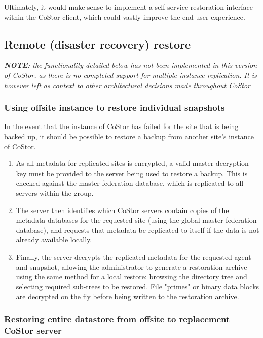 \documentclass[bsc,frontabs,twoside,singlespacing,parskip,deptreport]{infthesis}     %
\begin{document}
Ultimately, it would make sense to implement a self-service restoration interface within the CoStor
client, which could vastly improve the end-user experience.

\subsection{Remote (disaster recovery) restore}

\textit{\textbf{NOTE:} the functionality detailed below has not been implemented in this version of CoStor, as there is no completed support for multiple-instance replication. It is however left as context to other architectural decisions made throughout CoStor}

\subsubsection{Using offsite instance to restore individual snapshots}

In the event that the instance of CoStor has failed for the site that is being backed up, it should
be possible to restore a backup from another site's instance of CoStor.

\begin{enumerate}
	\item As all metadata for replicated sites is encrypted, a valid master decryption key must
	be provided to the server being used to restore a backup. This is checked against the master
	federation database, which is replicated to all servers within the group.
	\item The server then identifies which CoStor servers contain copies of the metadata 
	databases for the requested site (using the global master federation database), and requests
	that metadata be replicated to itself if the data is not already available locally.
	\item Finally, the server decrypts the replicated metadata for the requested agent and 
	snapshot, allowing the administrator to generate a restoration archive using the same
	method for a local restore: browsing the directory tree and selecting required sub-trees
	to be restored. File "primes" or binary data blocks are decrypted on the fly before being 
	written to the restoration archive.
\end{enumerate}

\subsubsection{Restoring entire datastore from offsite to replacement CoStor server}
\end{document}
